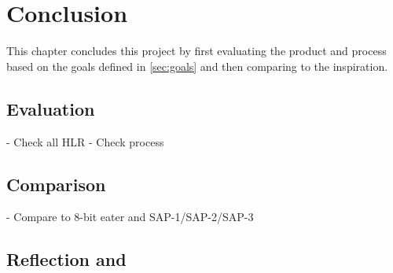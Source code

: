\chapter{Conclusion} \label{chap:conclusion}
This chapter concludes this project by first evaluating the product and process based on the goals defined in \ref{sec:goals} and then comparing to the inspiration.
\section{Evaluation}
- Check all HLR 
- Check process
\section{Comparison}
- Compare to 8-bit eater and SAP-1/SAP-2/SAP-3
\section{Reflection and }